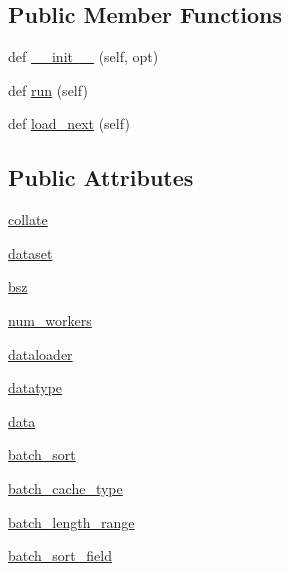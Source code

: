 \subsection*{Public Member Functions}
\begin{DoxyCompactItemize}
\item 
def \hyperlink{classparlai_1_1core_1_1pytorch__data__teacher_1_1LoaderProcess_a4d40640c8122f0f93dc49a3eaa188260}{\+\_\+\+\_\+init\+\_\+\+\_\+} (self, opt)
\item 
def \hyperlink{classparlai_1_1core_1_1pytorch__data__teacher_1_1LoaderProcess_a741c7edb04daec4d8623987b3de4406a}{run} (self)
\item 
def \hyperlink{classparlai_1_1core_1_1pytorch__data__teacher_1_1LoaderProcess_ac22783ccf0ae30d6c7de23e5dc73792b}{load\+\_\+next} (self)
\end{DoxyCompactItemize}
\subsection*{Public Attributes}
\begin{DoxyCompactItemize}
\item 
\hyperlink{classparlai_1_1core_1_1pytorch__data__teacher_1_1LoaderProcess_ac010d22e118d2b8a43df84cf863eb2f4}{collate}
\item 
\hyperlink{classparlai_1_1core_1_1pytorch__data__teacher_1_1LoaderProcess_abd64da305ebdbd4a506f06c9ab827d6f}{dataset}
\item 
\hyperlink{classparlai_1_1core_1_1pytorch__data__teacher_1_1LoaderProcess_ac69d820d98feb34c1c5a50a9b25f5fcd}{bsz}
\item 
\hyperlink{classparlai_1_1core_1_1pytorch__data__teacher_1_1LoaderProcess_a7ee2a0402dcf126f894d7490e57ac48e}{num\+\_\+workers}
\item 
\hyperlink{classparlai_1_1core_1_1pytorch__data__teacher_1_1LoaderProcess_a4ff8637f6f401f1431046ae039c78889}{dataloader}
\item 
\hyperlink{classparlai_1_1core_1_1pytorch__data__teacher_1_1LoaderProcess_acfb55a2adc1b4b4df2e1fb68239c60ba}{datatype}
\item 
\hyperlink{classparlai_1_1core_1_1pytorch__data__teacher_1_1LoaderProcess_a822f5ef502f3beed4227b34473415b21}{data}
\item 
\hyperlink{classparlai_1_1core_1_1pytorch__data__teacher_1_1LoaderProcess_ab33c0d0b4e2c9c8e821e904c1cd694b7}{batch\+\_\+sort}
\item 
\hyperlink{classparlai_1_1core_1_1pytorch__data__teacher_1_1LoaderProcess_ab2a63c11685407b16bd14c02605901c2}{batch\+\_\+cache\+\_\+type}
\item 
\hyperlink{classparlai_1_1core_1_1pytorch__data__teacher_1_1LoaderProcess_a9ca095ece0d32cab6da52cd8cae49ea1}{batch\+\_\+length\+\_\+range}
\item 
\hyperlink{classparlai_1_1core_1_1pytorch__data__teacher_1_1LoaderProcess_a8335e73023200d7605f4759303dbde23}{batch\+\_\+sort\+\_\+field}
\end{DoxyCompactItemize}


